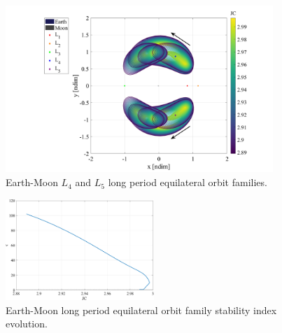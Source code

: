 \begin{figure}[ht]
    \centering
    \includegraphics[width=0.9\textwidth]{figures/LongPeriodFamily.pdf}
    \caption{Earth-Moon $L_{4}$ and $L_{5}$ long period equilateral orbit families.}
    \label{fig:longPeriod}
\end{figure}

\begin{figure}[ht]
    \centering
    \includegraphics[width=0.5\textwidth]{figures/LongPeriodStability.pdf}
    \caption{Earth-Moon long period equilateral orbit family stability index evolution.}
    \label{fig:longPeriodStability}
\end{figure}
